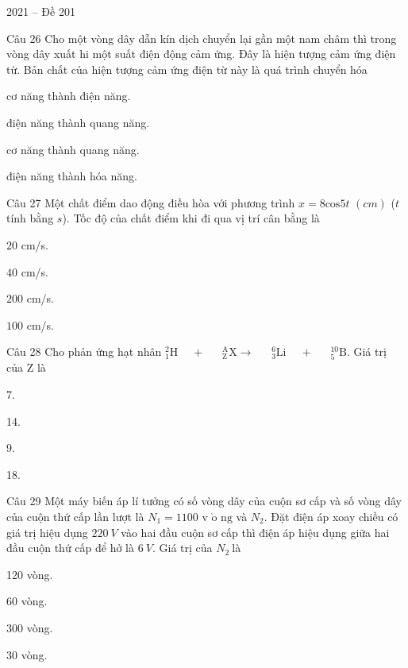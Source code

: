 \documentclass{book}
\begin{document}
\begin{quiz}{2021 – Đề 201}
\begin{multi}[points=1]{Câu 26}
 Cho một vòng dây dẫn kín dịch chuyển lại gần một nam châm thì trong vòng dây xuất hi một suất điện động cảm ứng. Đây là hiện tượng cảm ứng điện từ. Bản chất của hiện tượng cảm ứng điện từ này là quá trình chuyển hóa

\item*  cơ năng thành điện năng.	
\item  điện năng thành quang năng.	
\item  cơ năng thành quang năng.	
\item  điện năng thành hóa năng.
\end{multi}

\begin{multi}[points=1]{Câu 27}
 Một chất điểm dao động điều hòa với phương trình $x=8\text{cos}5t$ $\left( cm \right)$ ($t$ tính bằng $s$). Tốc độ của chất điểm khi đi qua vị trí cân bằng là

\item  $20$ cm/s.	
\item*  $40$ cm/s.	
\item  $200$ cm/s.	
\item  $100$ cm/s.
\end{multi}

\begin{multi}[points=1]{Câu 28}
 Cho phản ứng hạt nhân ${}_{1}^{2}\text{H }\!\!~\!\!\text{ }+\text{ }\!\!~\!\!\text{ }_{\text{Z}}^{\text{A}}\text{X}\to \text{ }\!\!~\!\!\text{ }_{3}^{6}\text{Li }\!\!~\!\!\text{ }+\text{ }\!\!~\!\!\text{ }_{5}^{10}\text{B}$. Giá trị của $\text{Z}$ là

\item*  7.	
\item  14.	
\item  9.	
\item  18.
\end{multi}

\begin{multi}[points=1]{Câu 29}
 Một máy biến áp lí tưởng có số vòng dây của cuộn sơ cấp và số vòng dây của cuộn thứ cấp lần lượt là ${{N}_{1}}=1100$ $\text{v }\!\!\grave{\mathrm{o}}\!\!\text{ ng}$ và ${{N}_{2}}$. Đặt điện áp xoay chiều có giá trị hiệu dụng $220~V$ vào hai đầu cuộn sơ cấp thì điện áp hiệu dụng giữa hai đầu cuộn thứ cấp để hở là $6~V$. Giá trị của ${{N}_{2}}~$là

\item  120 vòng.	
\item  60 vòng.	
\item  300 vòng.	
\item*  30 vòng.
\end{multi}


\end{quiz}
\end{document}
